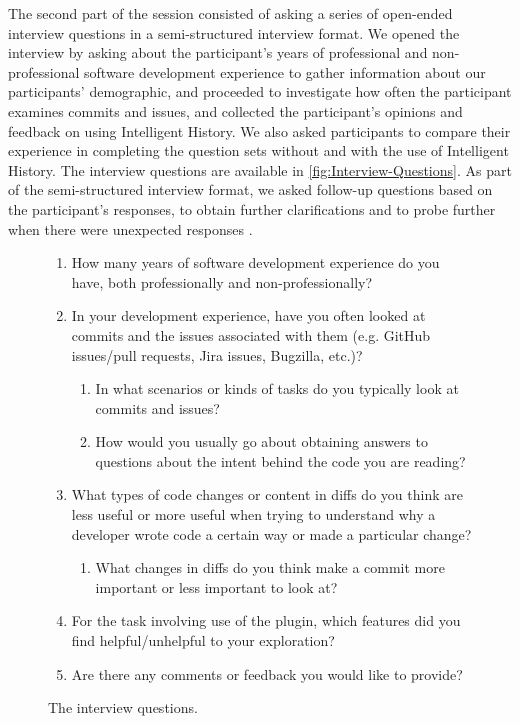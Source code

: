 The second part of the session consisted of asking a series of open-ended interview questions 
in a semi-structured interview format.
We opened the interview by asking about the participant's years of professional and non-professional software
development experience to gather information about our participants' demographic,
and proceeded to investigate how often the participant examines commits and issues,
and collected the participant's opinions and feedback on using Intelligent History.
We also asked participants to compare their experience in completing the question sets without and with the use of Intelligent History.
The interview questions are available in \autoref{fig:Interview-Questions}.
As part of the semi-structured interview format, 
we asked follow-up questions based on the participant's responses, to obtain further clarifications 
and to probe further when there were unexpected responses \cite{shull_guide_2007}. 

\begin{figure}[h]
  \begin{mdframed}
    \begin{enumerate}
      \item How many years of software development experience do you have, both professionally and non-professionally?
      \item In your development experience, have you often looked at commits and the issues associated with them (e.g. GitHub issues/pull requests, Jira issues, Bugzilla, etc.)?
          \begin{enumerate}
              \item In what scenarios or kinds of tasks do you typically look at commits and issues?
              \item How would you usually go about obtaining answers to questions about the intent behind the code you are reading?
          \end{enumerate}
      \item What types of code changes or content in diffs do you think are less useful or more useful when trying to understand why a developer wrote code a certain way or made a particular change? 
          \begin{enumerate}
              \item What changes in diffs do you think make a commit more important or less important to look at?
          \end{enumerate}
      \item For the task involving use of the plugin, which features did you find helpful/unhelpful to your exploration?
      \item Are there any comments or feedback you would like to provide?
    \end{enumerate}
\end{mdframed}
  \caption{The interview questions.}
  \label{fig:Interview-Questions}
\end{figure}

